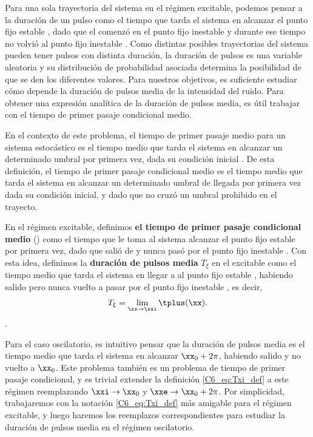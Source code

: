 {Para una sola trayectoria del sistema en el régimen excitable, podemos pensar a la duración de un pulso como el tiempo que tarda el sistema en alcanzar el punto fijo estable \xxe, dado que el comenzó en el punto fijo inestable \xxi y durante ese tiempo no volvió al punto fijo inestable \xxi. Como distintas posibles trayectorias del sistema pueden tener pulsos con distinta duración, la duración de pulsos es una variable aleatoria y su distribución de probabilidad asociada determina la posibilidad de que se den los diferentes valores. Para nuestros objetivos, es suficiente estudiar cómo depende la duración de pulsos media de la intensidad del ruido. Para obtener una expresión analítica de la duración de pulsos media, es útil trabajar con el tiempo de primer pasaje condicional medio. 


En el contexto de este problema, el tiempo de primer pasaje medio para un sistema estocástico es el tiempo medio que tarda el sistema en alcanzar un determinado umbral por primera vez, dada su condición inicial \cite{Redner2001}. De esta definición, el tiempo de primer pasaje condicional medio es el tiempo medio que tarda el sistema en alcanzar un determinado umbral de llegada por primera vez dada su condición inicial, y dado que no cruzó un umbral prohibido en el trayecto.  

En el régimen excitable, definimos \textbf{el tiempo de primer pasaje condicional medio} \tplus(\xx) como el tiempo que le toma al sistema alcanzar el punto fijo estable \xxe por primera vez, dado que salió de \xx y nunca pasó por el punto fijo inestable \xxi. Con esta idea, definimos la \textbf{duración de pulsos media} $T_\xi$ en el excitable como el tiempo medio que tarda el sistema en llegar a al punto fijo estable \xxe, habiendo salido pero nunca vuelto a pasar por el punto fijo inestable \xxi, es decir,
\begin{align}
    T_\xi = \lim_{\xx \rightarrow \xxi}\tplus(\xx).
    \label{C6_eq:Txi_def}
\end{align}.

Para el caso oscilatorio, es intuitivo pensar que la duración de pulsos media es el tiempo medio que tarda el sistema en alcanzar $\xx_0+2\pi$, habiendo salido y no vuelto a $\xx_0$. Este problema también es un problema de tiempo de primer pasaje condicional, y es trivial extender la definición \ref{C6_eq:Txi_def} a este régimen reemplazando $\xxi \rightarrow \xx_0$ y $\xxe \rightarrow \xx_0+2\pi$. Por simplicidad, trabajaremos con la notación \ref{C6_eq:Txi_def} más amigable para el régimen excitable, y luego haremos los reemplazos correspondientes para estudiar la duración de pulsos media en el régimen oscilatorio. 

}
